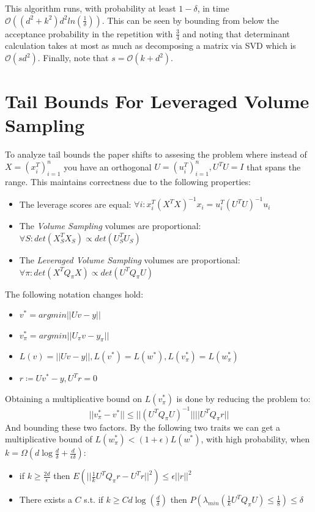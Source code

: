 \documentclass{article}
\begin{document}
        This algorithm runs, with probability at least $1-\delta$, in time $\mathcal{O}((d^2+k^2)d^2ln(\frac{1}{\delta}))$.
        This can be seen by bounding from below the acceptance probability in the repetition with $\frac{3}{4}$ and noting that determinant
        calculation takes at most as much as decomposing a matrix via SVD which is $\mathcal{O}(sd^2)$.
        Finally, note that $s=\mathcal{O}(k+d^2)$.

    \section{Tail Bounds For Leveraged Volume Sampling}
        To analyze tail bounds the paper shifts to assesing the problem where instead of $X=(x_{i}^T)_{i=1}^{n}$ you have an orthogonal $U=(u_{i}^T)_{i=1}^{n}, U^TU=I$ that spans the range.
        This maintains correctness due to the following properties:
        \begin{itemize}
            \item The leverage scores are equal: $\forall i: x_{i}^T(X^TX)^{-1}x_{i}=u_{i}^T(U^TU)^{-1}u_{i}$
            \item The \textit{Volume Sampling} volumes are proportional: $\forall S: det(X_{S}^TX_{S}) \propto det(U_{S}^TU_{S})$
            \item The \textit{Leveraged Volume Sampling} volumes are proportional: $\forall \pi: det(X^TQ_{\pi}X) \propto det(U^TQ_{\pi}U)$
        \end{itemize}

        The following notation changes hold:
        \begin{itemize}
            \item $v^\ast=argmin||Uv - y||$
            \item $v_{\pi}^\ast=argmin||U_{\pi}v - y_{\pi}||$
            \item $L(v) = ||Uv - y||, L(v^\ast) = L(w^\ast), L(v_{\pi}^\ast) = L(w_{\pi}^\ast)$
            \item $r \coloneqq Uv^\ast - y, U^Tr = 0$
        \end{itemize}

        Obtaining a multiplicative bound on $L(v_{\pi}^\ast)$ is done by reducing the problem to:
        \begin{equation}
            ||v_{\pi}^\ast - v^\ast|| \leq ||(U^TQ_{\pi}U)^{-1}||||U^TQ_{\pi}r||
        \end{equation}
        And bounding these two factors.
        By the following two traits we can get a multiplicative bound of $L(w_{\pi}^\ast) < (1+\epsilon)L(w^\ast)$,
        with high probability, when $k=\Omega(d\log \frac{d}{\delta} + \frac{d}{\epsilon\delta})$:
        \begin{itemize}
            \item if $k \geq \frac{2d}{\epsilon}$ then $E(||\frac{1}{k}U^TQ_{\pi}r - U^Tr||^2) \leq \epsilon||r||^2$
            \item There exists a $C$ s.t. if $k \geq Cd\log(\frac{d}{\delta})$ then $P(\lambda_{min}(\frac{1}{k}U^TQ_{\pi}U) \leq \frac{1}{8}) \leq \delta$
        \end{itemize}
\end{document}
